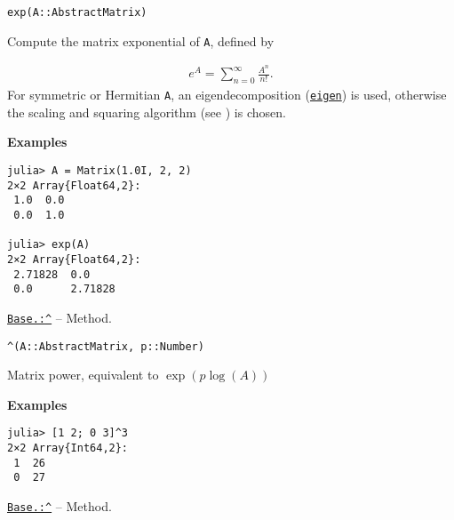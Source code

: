 \begin{adjustwidth}{2em}{0pt}


\begin{verbatim}
exp(A::AbstractMatrix)
\end{verbatim}

Compute the matrix exponential of \texttt{A}, defined by

\begin{equation*}
\begin{split}e^A = \sum_{n=0}^{\infty} \frac{A^n}{n!}.\end{split}\end{equation*}
For symmetric or Hermitian \texttt{A}, an eigendecomposition (\hyperlink{11056016707394839114}{\texttt{eigen}}) is used, otherwise the scaling and squaring algorithm (see \footnotemark[8]) is chosen.

\textbf{Examples}


\begin{verbatim}
julia> A = Matrix(1.0I, 2, 2)
2×2 Array{Float64,2}:
 1.0  0.0
 0.0  1.0

julia> exp(A)
2×2 Array{Float64,2}:
 2.71828  0.0
 0.0      2.71828
\end{verbatim}



\end{adjustwidth}
\hypertarget{13815303599818670515}{} 
\hyperlink{13815303599818670515}{\texttt{Base.:{\textasciicircum}}}  -- {Method.}

\begin{adjustwidth}{2em}{0pt}


\begin{verbatim}
^(A::AbstractMatrix, p::Number)
\end{verbatim}

Matrix power, equivalent to \(\exp(p\log(A))\)

\textbf{Examples}


\begin{verbatim}
julia> [1 2; 0 3]^3
2×2 Array{Int64,2}:
 1  26
 0  27
\end{verbatim}



\end{adjustwidth}
\hypertarget{7435396726429142215}{} 
\hyperlink{7435396726429142215}{\texttt{Base.:{\textasciicircum}}}  -- {Method.}

